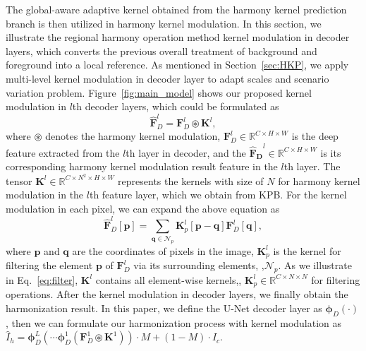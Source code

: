 \documentclass[10pt,twocolumn,letterpaper]{article}
\begin{document}
The global-aware adaptive kernel obtained from the harmony kernel prediction branch is then utilized in harmony kernel modulation. In this section, we illustrate the regional harmony operation method kernel modulation in decoder layers, which converts the previous overall treatment of background and foreground into a local reference. As mentioned in Section~\ref{sec:HKP}, we apply multi-level kernel modulation in decoder layer to adapt scales and scenario variation problem. Figure~\ref{fig:main_model} shows our proposed kernel modulation in $l$th decoder layers, which could be formulated as
\begin{equation}
    \mathbf{\hat{F}}_{D}^l = \mathbf{F}_D^l \circledast \mathbf{K}^{l},
    \label{eq:filter}
\end{equation}
where $ \circledast$ denotes the harmony kernel modulation, $ \mathbf{F}_{D}^l \in \mathbb{R}^{C \times H \times W} $ is the deep feature extracted from the $l$th layer in decoder, and the $ \mathbf{\hat{F}_D}^l \in \mathbb{R}^{C \times H \times W} $ is its corresponding harmony kernel modulation result feature in the $l$th layer. The tensor $ \mathbf{K}^l \in \mathbb{R}^{C \times N^2 \times H \times W}$ represents the kernels with size of $N$ for harmony kernel modulation in the $l$th feature layer, which we obtain from KPB. For the kernel modulation in each pixel, we can expand the above equation as
\begin{equation}
    \mathbf{\hat{F}}_D^l[\mathbf{p}]=\sum_{\mathbf{q}\in \mathcal{N}_p} \mathbf{K}^l_p[\mathbf{p-q}]\mathbf{F}^l_D[\mathbf{q}],
    \label{eq:filterexpand}
\end{equation}
where $\mathbf{p}$ and $\mathbf{q}$ are the coordinates of pixels in the image, $\mathbf{K}^l_p$ is the kernel for filtering the element $\mathbf{p}$ of $\mathbf{F}_D^l$ via its surrounding elements, \ie,$\mathcal{N}_p$. As we illustrate in Eq.~\ref{eq:filter}, $\mathbf{K}^l$ contains all element-wise kernels,\ie, $\mathbf{K}^l_p \in \mathbb{R}^{C \times N \times N}$ for filtering operations. After the kernel modulation in decoder layers, we finally obtain the harmonization result. In this paper, we define the U-Net decoder layer as $\boldsymbol\phi_D(\cdot)$, then we can formulate our harmonization process with kernel modulation as 
$\hat{I}_h=\boldsymbol\phi_D^{L}(\cdots \boldsymbol\phi_D^{1}(\mathbf{F}^1_D \circledast \mathbf{K}^1)) \cdot M + (1-M) \cdot I_c$.
\end{document}
